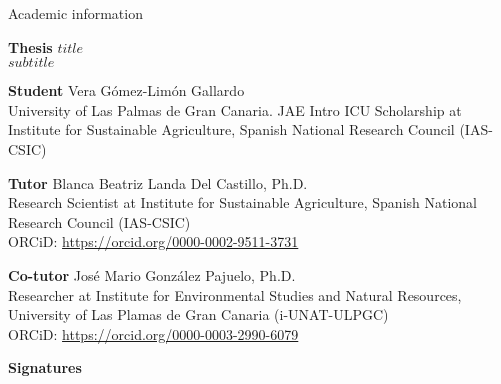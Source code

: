 \begin{flushleft}
  \Large
    Academic information
        
  \vspace{0.5cm}
  \normalsize
  \textbf{Thesis}
    $title$\\
    $subtitle$
  
  \vspace{0.5cm}
  \textbf{Student}
    Vera Gómez-Limón Gallardo\\
    University of Las Palmas de Gran Canaria. JAE Intro ICU Scholarship at Institute for Sustainable Agriculture, Spanish National Research Council (IAS-CSIC)
  
  \vspace{0.5cm}
  \textbf{Tutor}
    Blanca Beatriz Landa Del Castillo, Ph.D.\\
    Research Scientist at Institute for Sustainable Agriculture, Spanish National Research Council (IAS-CSIC)\\
    ORCiD: \url{https://orcid.org/0000-0002-9511-3731}
  
  \vspace{0.5cm}
  \textbf{Co-tutor}
    José Mario González Pajuelo, Ph.D.\\
    Researcher at Institute for Environmental Studies and Natural Resources, University of Las Plamas de Gran Canaria (i-UNAT-ULPGC)\\
    ORCiD: \url{https://orcid.org/0000-0003-2990-6079}
  
  \vspace{0.5cm}
  \centerline{\textbf{Signatures}}
\end{flushleft}